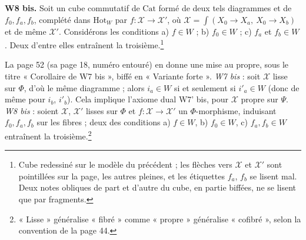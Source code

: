 \documentclass[11pt,a4paper]{article}
\begin{document}
\textbf{W8 bis.} Soit un cube commutatif de $\mathrm{Cat}$ formé de deux tels
diagrammes et de $f_0, f_a, f_b$, complété dans $\mathrm{Hot}_W$ par
$f : \mathcal{X} \to \mathcal{X}'$, où $\mathcal{X} = \int(X_0 \to X_a,\ X_0
\to X_b)$ et de même $\mathcal{X}'$. Considérons les conditions a) $f \in W$ ;
b) $f_0 \in W$ ; c) $f_a$ et $f_b \in W$. Deux d'entre elles entraînent la
troisième.\footnote{Cube redessiné sur le modèle du précédent ; les flèches vers
$\mathcal{X}$ et $\mathcal{X}'$ sont pointillées sur la page, les autres
pleines, et les étiquettes $f_a$, $f_b$ se lisent mal. Deux notes obliques de
part et d'autre du cube, en partie biffées, ne se lisent que par fragments.}



La page 52 (sa page 18, numéro entouré) en donne une mise au propre, sous le
titre « Corollaire de W7 bis », biffé en « Variante forte ». \emph{W7 bis} :
soit $\mathcal{X}$ lisse sur $\Phi$, d'où le même diagramme ; alors
$i_a \in W$ si et seulement si $i'_a \in W$ (donc de même pour $i_b$,
$i'_b$). Cela implique l'axiome dual W7' bis, pour $\mathcal{X}$ propre sur
$\Psi$. \emph{W8 bis} : soient $\mathcal{X}$, $\mathcal{X}'$ lisses sur
$\Phi$ et $f : \mathcal{X} \to \mathcal{X}'$ un $\Phi$-morphisme, induisant
$f_0, f_a, f_b$ sur les fibres ; deux des conditions a) $f \in W$, b) $f_0 \in
W$, c) $f_a, f_b \in W$ entraînent la troisième.\footnote{« Lisse »
généralise « fibré » comme « propre » généralise « cofibré », selon la
convention de la page 44.}
\end{document}
